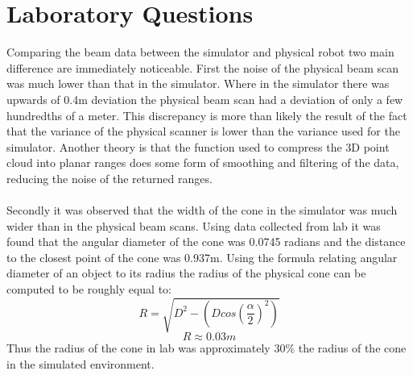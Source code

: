 \documentclass[letterpaper,12pt]{article}
\begin{document}
\section{Laboratory Questions}
Comparing the beam data between the simulator and physical robot two main difference are immediately noticeable. First the noise of the physical beam scan was much lower than that in the simulator. Where in the simulator there was upwards of 0.4m deviation the physical beam scan had a deviation of only a few hundredths of a meter. This discrepancy is more than likely the result of the fact that the variance of the physical scanner is lower than the variance used for the simulator. Another theory is that the function used to compress the 3D point cloud into planar ranges does some form of smoothing and filtering of the data, reducing the noise of the returned ranges. 
\\\\
Secondly it was observed that the width of the cone in the simulator was much wider than in the physical beam scans. Using data collected from lab it was found that the angular diameter of the cone was 0.0745 radians and the distance to the closest point of the cone was 0.937m. Using the formula relating angular diameter of an object to its radius the radius of the physical cone can be computed to be roughly equal to:
$$R=\sqrt{D^2-(Dcos(\frac{\alpha}{2})^2)}$$
$$R \approx 0.03m$$
Thus the radius of the cone in lab was approximately 30\% the radius of the cone in the simulated environment.   













\end{document}
